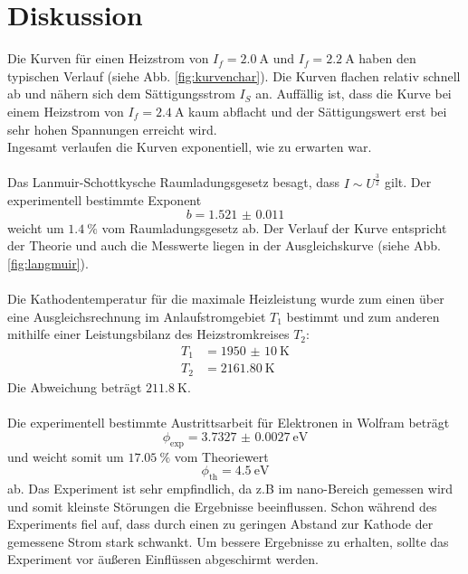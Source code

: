 \section{Diskussion}
\label{sec:Diskussion}
Die Kurven für einen Heizstrom von $I_f = \SI{2.0}{\ampere}$ und $I_f = \SI{2.2}{\ampere}$ haben den typischen Verlauf (siehe Abb. \ref{fig:kurvenchar}).
Die Kurven flachen relativ schnell ab und nähern sich dem Sättigungsstrom $I_S$ an.
Auffällig ist, dass die Kurve bei einem Heizstrom von $I_f=\SI{2.4}{\ampere}$ kaum abflacht und der Sättigungswert erst bei sehr hohen Spannungen erreicht wird.
\\
Ingesamt verlaufen die Kurven exponentiell, wie zu erwarten war.
\\\\
Das Lanmuir-Schottkysche Raumladungsgesetz besagt, dass $I \sim U^{\frac{3}{2}}$ gilt.
Der experimentell bestimmte Exponent
\begin{equation*}
    b = \num{1.521(11)}
\end{equation*}
weicht um $\SI{1.4}{\percent}$ vom Raumladungsgesetz ab.
Der Verlauf der Kurve entspricht der Theorie und auch die Messwerte liegen in der Ausgleichskurve (siehe Abb. \ref{fig:langmuir}).
\\\\
Die Kathodentemperatur für die maximale Heizleistung wurde zum einen über eine Ausgleichsrechnung im Anlaufstromgebiet $T_1$ bestimmt und zum anderen mithilfe einer Leistungsbilanz des Heizstromkreises $T_2$:
\begin{align*}
    T_1 &= \SI{1950(10)}{\kelvin} \\
    T_2 &= \SI{2161.80}{\kelvin}
\end{align*}
Die Abweichung beträgt $\SI{211.8}{\kelvin}$.
\\\\
Die experimentell bestimmte Austrittsarbeit für Elektronen in Wolfram beträgt
\begin{equation*}
    \phi_\text{exp} = \SI{3.7327(27)}{\electronvolt}
\end{equation*}
und weicht somit um $\SI{17.05}{\percent}$ vom Theoriewert \cite{austrittsarbeit}
\begin{equation*}
    \phi_\text{th} = \SI{4.5}{\electronvolt}
\end{equation*}
ab.
Das Experiment ist sehr empfindlich, da z.B im nano-Bereich gemessen wird und somit kleinste Störungen die Ergebnisse beeinflussen.
Schon während des Experiments fiel auf, dass durch einen zu geringen Abstand zur Kathode der gemessene Strom stark schwankt.
Um bessere Ergebnisse zu erhalten, sollte das Experiment vor äußeren Einflüssen abgeschirmt werden.
